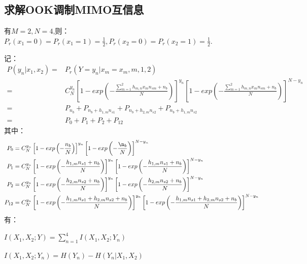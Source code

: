 \documentclass[12pt]{article}
\begin{document}
\subsection{求解OOK调制MIMO互信息}
有$M=2,N=4$,则：$P_r(x_1=0)=P_r(x_1=1)=\frac{1}{2},P_r(x_2=0)=P_r(x_2=1)=\frac{1}{2}$.
\par
记：
\begin{equation*}
    \begin{aligned}
       P(y_n|x_1,x_2)=&P_r(Y=y_n|x_m=x_m,m,1,2) \\
       =&C_N^{y_n}\left[1-exp\left(-\frac{\sum_{m=1}^2h_{m,n}x_{m}n_{sm}+n_b}{N}\right)\right]^{y_n}\left[1-exp\left(-\frac{\sum_{m=1}^2h_{m,n}x_{m}n_{sm}+n_b}{N}\right)\right]^{N-y_n} \\
       =&P_{n_b}+P_{n_b+h_{1,m}n_{s1}}+P_{n_b+h_{2,m}n_{s2}}+P_{n_b+h_{1,m}n_{s2}}\\
       =&P_0+P_1+P_2+P_{12}
    \end{aligned}
\end{equation*}
其中：
\begin{equation*}
    \begin{aligned}
       P_0&=C_N^{y_n}\left[1-exp\left(-\frac{n_b}{N}\right)\right]^{y_n}\left[1-exp\left(-\frac{\n_b}{N}\right)\right]^{N-y_n} \\
       P_1&=C_N^{y_n}\left[1-exp\left(-\frac{h_{1,m}n_{s1}+n_b}{N}\right)\right]^{y_n}\left[1-exp\left(-\frac{h_{1,m}n_{s1}+n_b}{N}\right)\right]^{N-y_n} \\
       P_2&=C_N^{y_n}\left[1-exp\left(-\frac{h_{2,m}n_{s2}+n_b}{N}\right)\right]^{y_n}\left[1-exp\left(-\frac{h_{2,m}n_{s2}+n_b}{N}\right)\right]^{N-y_n} \\
       P_{12}&=C_N^{y_n}\left[1-exp\left(-\frac{h_{1,m}n_{s1}+h_{2,m}n_{s2}+n_b}{N}\right)\right]^{y_n}\left[1-exp\left(-\frac{h_{1,m}n_{s1}+h_{2,m}n_{s2}+n_b}{N}\right)\right]^{N-y_n}
    \end{aligned}
\end{equation*}
有：\par
$I(X_1,X_2;Y)=\sum_{n=1}^4I(X_1,X_2;Y_n)$\par
$I(X_1,X_2;Y_n)=H(Y_n)-H(Y_n|X_1,X_2)$
\end{document}
